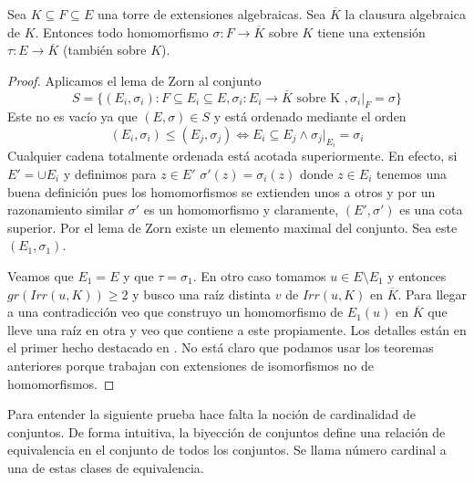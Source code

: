 \begin{theorem}
Sea $K \subseteq F \subseteq E$ una torre de extensiones algebraicas. Sea $\overline{K}$ la clausura algebraica de $K$. Entonces todo homomorfismo $\sigma:F \to \overline{K}$ sobre $K$ tiene una extensión $\tau:E \to \overline{K}$ (también sobre $K$). 

\end{theorem}
\begin{proof}
Aplicamos el lema de Zorn al conjunto $$S= \{(E_i,\sigma_i):F \subseteq E_i \subseteq E,\sigma_i:E_i \to \overline{K} \text{ sobre K },\sigma_i|_F = \sigma\}$$ Este no es vacío ya que $(E,\sigma) \in S$ y está ordenado mediante el orden $$(E_i,\sigma_i) \le (E_j,\sigma_j) \iff E_i \subseteq E_j \land \sigma_j|_{E_i}= \sigma_i$$ Cualquier cadena totalmente ordenada está acotada superiormente. En efecto, si $E' = \cup E_i$ y definimos para $z \in E'$ $\sigma'(z) = \sigma_i(z)$ donde $z \in E_i$ tenemos una buena definición pues los homomorfismos se extienden unos a otros y por un razonamiento similar $\sigma'$ es un homomorfismo \cite{link5} y claramente, $(E',\sigma')$ es una cota superior. Por el lema de Zorn existe un elemento maximal del conjunto. Sea este $(E_1,\sigma_1)$.

Veamos que $E_1 = E$ y que $\tau = \sigma_1$. En otro caso tomamos $u \in E \setminus E_1$ y entonces $gr(Irr(u,K)) \ge 2$  y busco una raíz distinta $v$ de $Irr(u,K)$ en $\overline{K}$. Para llegar a una contradicción veo que construyo un homomorfismo de $E_1(u)$ en $\overline{K}$ que lleve una raíz en otra y veo que contiene a este propiamente. Los detalles están en el primer hecho destacado en \cite{link5}. No está claro que podamos usar los teoremas anteriores porque trabajan con extensiones de isomorfismos no de homomorfismos. 
\end{proof}

Para entender la siguiente prueba hace falta la noción de cardinalidad de conjuntos. De forma intuitiva, la biyección de conjuntos define una relación de equivalencia en el conjunto de todos los conjuntos. Se llama número cardinal a una de estas clases de equivalencia. 

